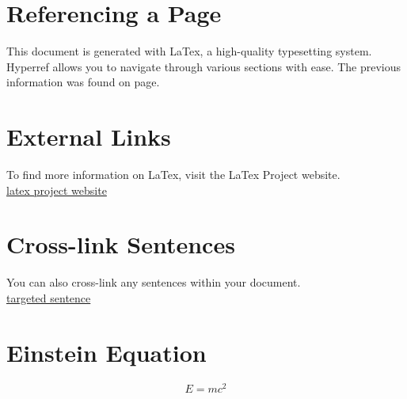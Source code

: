 \documentclass{article}
\begin{document}
\section{Referencing a Page}
\label{sec:page}
This document is generated with LaTex, a high-quality typesetting system. Hyperref allows you to navigate through various sections with ease. The previous information was found on page. \pageref{sec:intro}

\section{External Links}
To find more information on LaTex, visit the LaTex Project website.\\
\href{https://www.latex-project.org/}{latex project website}

\section{Cross-link Sentences}
You can also cross-link any sentences within your document. \\
\hyperlink{label}{targeted sentence}


\section{Einstein Equation}
\begin{equation}
E = mc^2
\label{eq:einstein}
\end{equation}
\end{document}
